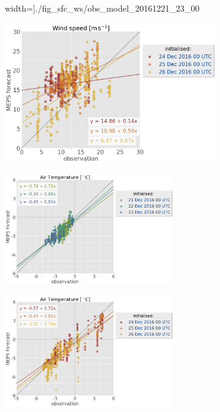 \begin{figure}
\begin{subfigure}[b]{0.49\textwidth}
    width=\textwidth]{./fig_sfc_ws/obs_model_20161221_23_00}
     	\caption{}\label{fig:scat:ws2123}
     \end{subfigure}
	\begin{subfigure}[b]{0.49\textwidth}
     	\includegraphics[trim={0.cm 0cm 12.5cm 0cm},clip,
    width=\textwidth]{./fig_sfc_ws/obs_model_20161224_26_00}
     	\caption{}\label{fig:scat:ws2426}
     \end{subfigure}
     \begin{subfigure}[b]{0.49\textwidth}
     	\centering
     	\includegraphics[trim={25.cm 15.5cm 0cm 3.6cm},clip,
    width=0.8\textwidth]{./fig_sfc_temp/obs_model_20161221_23_00}
     \end{subfigure}
     \begin{subfigure}[b]{0.49\textwidth}
     	\centering
     	\includegraphics[trim={25.cm 15.5cm 0cm 3.6cm},clip,
    width=0.8\textwidth]{./fig_sfc_temp/obs_model_20161224_26_00}
    \end{subfigure}
\end{figure}
